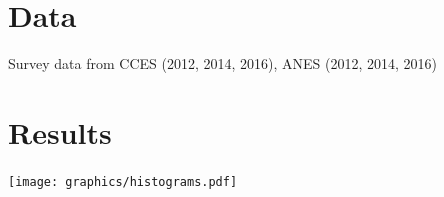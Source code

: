 \documentclass[a0]{a0poster}
\begin{document}
\begin{multicols*}{3}
\section*{Data}

Survey data from CCES (2012, 2014, 2016), ANES (2012, 2014, 2016)

\columnbreak




\section*{Results}

\begin{center}
  \texttt{[image: graphics/histograms.pdf]}
\end{center}



%
\vfill
\footnotesize
\printbibliography
% 
% 

\end{multicols*}
\end{document}
